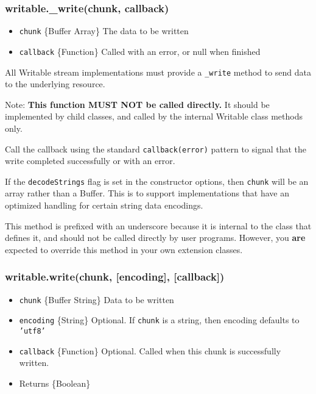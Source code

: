 \subsubsection{writable.\_write(chunk, callback)}

\begin{itemize}
\item
  \texttt{chunk} \{Buffer \textbar{} Array\} The data to be written
\item
  \texttt{callback} \{Function\} Called with an error, or null when
  finished
\end{itemize}

All Writable stream implementations must provide a \texttt{\_write}
method to send data to the underlying resource.

Note: \textbf{This function MUST NOT be called directly.} It should be
implemented by child classes, and called by the internal Writable class
methods only.

Call the callback using the standard \texttt{callback(error)} pattern to
signal that the write completed successfully or with an error.

If the \texttt{decodeStrings} flag is set in the constructor options,
then \texttt{chunk} will be an array rather than a Buffer. This is to
support implementations that have an optimized handling for certain
string data encodings.

This method is prefixed with an underscore because it is internal to the
class that defines it, and should not be called directly by user
programs. However, you \textbf{are} expected to override this method in
your own extension classes.

\subsubsection{writable.write(chunk, {[}encoding{]}, {[}callback{]})}

\begin{itemize}
\item
  \texttt{chunk} \{Buffer \textbar{} String\} Data to be written
\item
  \texttt{encoding} \{String\} Optional. If \texttt{chunk} is a string,
  then encoding defaults to \texttt{'utf8'}
\item
  \texttt{callback} \{Function\} Optional. Called when this chunk is
  successfully written.
\item
  Returns \{Boolean\}
\end{itemize}

